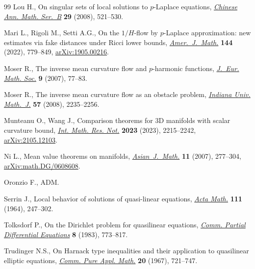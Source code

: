 \documentclass[10pt,a4paper]{amsart}
\numberwithin{equation}{section}
\begin{document}
\begin{thebibliography}{99}
Lou H., On singular sets of local solutions to {$p$}-{L}aplace equations,
 \href{https://doi.org/10.1007/s11401-007-0312-y}{\textit{Chinese Ann. Math. Ser.~B}} \textbf{29} (2008), 521--530.

Mari L., Rigoli M., Setti A.G., On the {$1/H$}-flow by {$p$}-{L}aplace
 approximation: new estimates via fake distances under {R}icci lower bounds,
 \href{https://doi.org/10.1353/ajm.2022.0016}{\textit{Amer.~J.~Math.}} \textbf{144} (2022), 779--849, \href{https://arxiv.org/abs/1905.00216}{arXiv:1905.00216}.

Moser R., The inverse mean curvature flow and {$p$}-harmonic functions,
 \href{https://doi.org/10.4171/JEMS/73}{\textit{J.~Eur. Math. Soc.}} \textbf{9} (2007), 77--83.

Moser R., The inverse mean curvature flow as an obstacle problem,
 \href{https://doi.org/10.1512/iumj.2008.57.3385}{\textit{Indiana Univ. Math.~J.}} \textbf{57} (2008), 2235--2256.

Munteanu O., Wang J., Comparison theorems for 3{D} manifolds with scalar
 curvature bound, \href{https://doi.org/10.1093/imrn/rnab307}{\textit{Int. Math. Res. Not.}} \textbf{2023} (2023),
 2215--2242, \href{https://arxiv.org/abs/2105.12103}{arXiv:2105.12103}.

Ni L., Mean value theorems on manifolds, \href{https://doi.org/10.4310/AJM.2007.v11.n2.a6}{\textit{Asian~J.~Math.}} \textbf{11}
 (2007), 277--304, \href{https://arxiv.org/abs/math.DG/0608608}{arXiv:math.DG/0608608}.

Oronzio F., {ADM}.

Serrin J., Local behavior of solutions of quasi-linear equations, \href{https://doi.org/10.1007/BF02391014}{\textit{Acta
 Math.}} \textbf{111} (1964), 247--302.

Tolksdorf P., On the {D}irichlet problem for quasilinear equations,
 \href{https://doi.org/10.1080/03605308308820285}{\textit{Comm. Partial Differential Equations}} \textbf{8} (1983), 773--817.

Trudinger N.S., On {H}arnack type inequalities and their application to
 quasilinear elliptic equations, \href{https://doi.org/10.1002/cpa.3160200406}{\textit{Comm. Pure Appl. Math.}} \textbf{20}
 (1967), 721--747.


\end{thebibliography}
\end{document}
